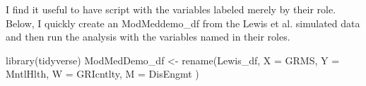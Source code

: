 \documentclass[
]{book}
\newenvironment{Shaded}{\begin{snugshade}}{\end{snugshade}}
\newcommand{\AttributeTok}[1]{\textcolor[rgb]{0.77,0.63,0.00}{#1}}
\newcommand{\FunctionTok}[1]{\textcolor[rgb]{0.00,0.00,0.00}{#1}}
\newcommand{\NormalTok}[1]{#1}
\newcommand{\OtherTok}[1]{\textcolor[rgb]{0.56,0.35,0.01}{#1}}
\begin{document}
I find it useful to have script with the variables labeled merely by their role. Below, I quickly create an ModMeddemo\_df from the Lewis et al. \citep{lewis_applying_2017} simulated data and then run the analysis with the variables named in their roles.

\begin{Shaded}
\begin{Highlighting}[]
\FunctionTok{library}\NormalTok{(tidyverse)}
\NormalTok{ModMedDemo\_df }\OtherTok{\textless{}{-}} \FunctionTok{rename}\NormalTok{(Lewis\_df, }\AttributeTok{X =}\NormalTok{ GRMS, }\AttributeTok{Y =}\NormalTok{ MntlHlth, }\AttributeTok{W =}\NormalTok{ GRIcntlty, }\AttributeTok{M =}\NormalTok{ DisEngmt )}
\end{Highlighting}
\end{Shaded}
\end{document}
